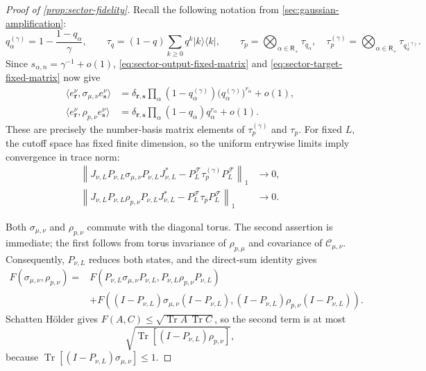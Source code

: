 \documentclass[11pt]{article}
\theoremstyle{remark}
\theoremstyle{plain}
\newcommand{\cC}{\mathcal C}
\newcommand{\cF}{\mathcal F}
\newcommand{\Tr}{\operatorname{Tr}}
\newcommand{\proj}[1]{|#1\rangle\!\langle #1|}
\begin{document}
\begin{proof}[Proof of \cref{prop:sector-fidelity}]
Recall the following notation from \cref{sec:gaussian-amplification}:
\[
  q_\alpha^{(\gamma)}=1-\frac{1-q_\alpha}{\gamma},
  \qquad
  \tau_q=(1-q)\sum_{k\ge0}q^k\proj{k},
  \qquad
  \tau_p=\bigotimes_{\alpha\in\mathsf R_+}\tau_{q_\alpha},
  \quad
  \tau_p^{(\gamma)}
  =\bigotimes_{\alpha\in\mathsf R_+}\tau_{q_\alpha^{(\gamma)}}.
\]
Since \(s_{\alpha,n}=\gamma^{-1}+o(1)\),
\eqref{eq:sector-output-fixed-matrix} and
\eqref{eq:sector-target-fixed-matrix} now give
\[
\begin{aligned}
  \langle e_{\mathbf r}^\nu,
    \sigma_{\mu,\nu}e_{\mathbf s}^\nu\rangle
  &=\delta_{\mathbf r,\mathbf s}
    \prod_\alpha(1-q_\alpha^{(\gamma)})
    \bigl(q_\alpha^{(\gamma)}\bigr)^{r_\alpha}+o(1),\\
  \langle e_{\mathbf r}^\nu,
    \rho_{p,\nu}e_{\mathbf s}^\nu\rangle
  &=\delta_{\mathbf r,\mathbf s}
    \prod_\alpha(1-q_\alpha)q_\alpha^{r_\alpha}+o(1).
\end{aligned}
\]
These are precisely the number-basis matrix elements of
\(\tau_p^{(\gamma)}\) and \(\tau_p\).
For fixed \(L\), the cutoff space has fixed finite dimension, so the uniform
entrywise limits imply convergence in trace norm:
\begin{align}
  \left\|
  J_{\nu,L}P_{\nu,L}\sigma_{\mu,\nu}P_{\nu,L}J_{\nu,L}^*
  -P_L^{\cF}\tau_p^{(\gamma)}P_L^{\cF}
  \right\|_1&\longrightarrow0,
  \label{eq:output-fixed-height-convergence}\\
  \left\|
  J_{\nu,L}P_{\nu,L}\rho_{p,\nu}P_{\nu,L}J_{\nu,L}^*
  -P_L^{\cF}\tau_pP_L^{\cF}
  \right\|_1&\longrightarrow0.
  \label{eq:target-fixed-height-convergence}
\end{align}

Both \(\sigma_{\mu,\nu}\) and \(\rho_{p,\nu}\) commute with
the diagonal torus.  The second assertion is immediate; the first follows
from torus invariance of \(\rho_{p,\mu}\) and covariance of
\(\cC_{\mu,\nu}\).
Consequently, \(P_{\nu,L}\) reduces both states, and the direct-sum identity
gives
\[
\begin{aligned}
  F(\sigma_{\mu,\nu},\rho_{p,\nu})
  ={}&F(P_{\nu,L}\sigma_{\mu,\nu}P_{\nu,L},
        P_{\nu,L}\rho_{p,\nu}P_{\nu,L})\\
  &+F((I-P_{\nu,L})\sigma_{\mu,\nu}(I-P_{\nu,L}),
       (I-P_{\nu,L})\rho_{p,\nu}(I-P_{\nu,L})).
\end{aligned}
\]
Schatten H\"older gives \(F(A,C)\le\sqrt{\Tr A\,\Tr C}\), so the second
term is at most
\begin{equation}\label{eq:sector-tail-fidelity-bound}
  \sqrt{\Tr[(I-P_{\nu,L})\rho_{p,\nu}]},
\end{equation}
because \(\Tr[(I-P_{\nu,L})\sigma_{\mu,\nu}]\le1\).


\end{proof}
\end{document}

